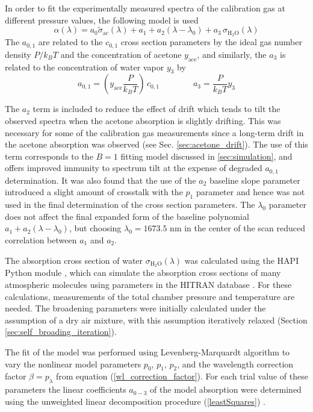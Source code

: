\documentclass[8pt,a4paper]{report}
\begin{document}
	In order to fit the experimentally measured spectra of the calibration gas at different pressure values, the following model is used
	\begin{equation} \label{fit_model}
		\alpha(\lambda) = a_0\tilde{\sigma}_{\mathrm{ac}}(\lambda) + a_1 + a_2(\lambda - \lambda_0) + a_3\,\sigma_\mathrm{H_2O}(\lambda)
	\end{equation}
	The $a_{0,1}$ are related to the $c_{0,1}$ cross section parameters by the ideal gas number density $P/k_B T$ and the concentration of acetone $y_\mathrm{ace}$, and similarly, the $a_3$ is related to the concentration of water vapor $y_3$ by
	\begin{equation} \label{ai}
		a_{0,1} = \left(y_\mathrm{ace}\frac{P}{k_B T}\right)\,c_{0,1} \qquad\qquad
		a_{3} = \frac{P}{k_B T} y_{3}
	\end{equation}
	
	The $a_2$ term is included to reduce the effect of drift which tends to tilt the observed spectra when the acetone absorption is slightly drifting. This was necessary for some of the calibration gas measurements since a long-term drift in the acetone absorption was observed (see Sec. \ref{sec:acetone_drift}). The use of this term corresponds to the $B=1$ fitting model discussed in \ref{sec:simulation}, and offers improved immunity to spectrum tilt at the expense of degraded $a_{0,1}$ determination. It was also found that the use of the $a_2$ baseline slope parameter introduced a slight amount of crosstalk with the $p_1$ parameter and hence was not used in the final determination of the cross section parameters. The $\lambda_0$ parameter does not affect the final expanded form of the baseline polynomial $a_1 + a_2(\lambda-\lambda_0)$, but choosing $\lambda_0 =1673.5$ nm in the center of the scan reduced correlation between $a_{1}$ and $a_2$.
	
	The absorption cross section of water $\sigma_\mathrm{H_2O}(\lambda)$ was calculated using the HAPI Python module \cite{HAPI_2016}, which can simulate the absorption cross sections of many atmospheric molecules using parameters in the HITRAN database \cite{hitran_2020}. For these calculations, measurements of the total chamber pressure and temperature are needed. The broadening parameters were initially calculated under the assumption of a dry air mixture, with this assumption iteratively relaxed (Section \ref{sec:self_broading_iteration}).
	
	The fit of the model was performed using Levenberg-Marquardt algorithm to vary the nonlinear model parameters $p_0$, $p_1$, $p_2$, and the wavelength correction factor $\beta = p_\lambda$ from equation (\ref{wl_correction_factor}). For each trial value of these parameters the linear coefficients $a_{0-3}$ of the model absorption were determined using the unweighted linear decomposition procedure (\ref{leastSquares}) .
	
\end{document}
